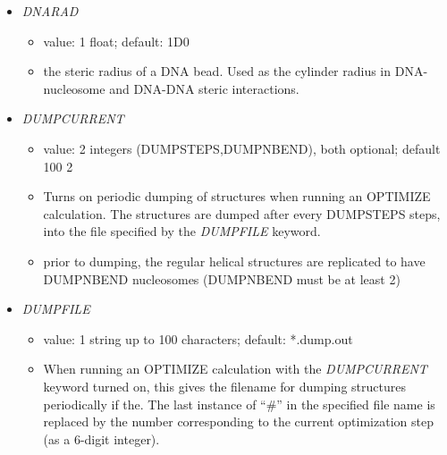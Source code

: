 \documentclass[12pt,dvips]{article}
\begin{document}
\begin{itemize}
%
\item {\it DNARAD}
  \begin{itemize}
    \item value: 1 float; default: 1D0
    \item the steric radius of a DNA bead. Used as the cylinder radius in DNA-nucleosome and DNA-DNA steric interactions.
  \end{itemize}
%
\item {\it DUMPCURRENT}  
  \begin{itemize}
  \item value: 2 integers (DUMPSTEPS,DUMPNBEND), both optional; default 100 2
  \item Turns on periodic dumping of structures when running an OPTIMIZE calculation. The structures are dumped after every DUMPSTEPS steps, into the file specified by the {\it DUMPFILE} keyword.
  \item prior to dumping, the regular helical structures are replicated to have DUMPNBEND nucleosomes (DUMPNBEND must be at least 2)
  \end{itemize}
%
\item {\it DUMPFILE}
  \begin{itemize}
    \item value: 1 string up to 100 characters; default: *.dump.out     
    \item When running an OPTIMIZE calculation with the {\em DUMPCURRENT} keyword turned on, this gives the filename for dumping structures periodically if the. The last instance of ``\#'' in the specified file name is replaced by the number corresponding to the current optimization step (as a 6-digit integer). 

\end{itemize}
\end{itemize}
\end{document}
